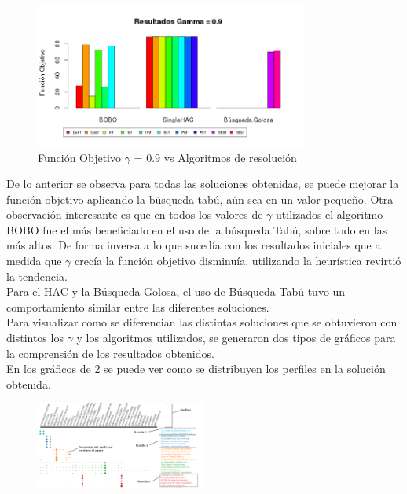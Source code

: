 \begin{figure}[H]
  \centering
    \includegraphics[width=0.8\textwidth]{resultados/papers/Graficos_agrupados/gamma09.png}
  \caption{Función Objetivo $\gamma$ = $0.9$ vs Algoritmos de resolución}
  \label{res:img-papers-agr-gamma09}
\end{figure}

De lo anterior se observa para todas las soluciones obtenidas, se puede mejorar la función objetivo aplicando la búsqueda tabú, aún sea en un valor pequeño. Otra observación interesante es que en todos los valores de $\gamma$ utilizados el algoritmo BOBO fue el más beneficiado en el uso de la búsqueda Tabú, sobre todo en las más altos. De forma inversa a lo que sucedía con los resultados iniciales que a medida que $\gamma$ crecía la función objetivo disminuía, utilizando la heurística revirtió la tendencia.\\
Para el HAC y la Búsqueda Golosa, el uso de Búsqueda Tabú tuvo un comportamiento similar entre las diferentes soluciones.\\
Para visualizar como se diferencian las distintas soluciones que se obtuvieron con distintos los $\gamma$ y los algoritmos utilizados, se generaron dos tipos de gráficos para la comprensión de los resultados obtenidos.\\
En los gráficos de \ref{res:img-explain-bars} se puede ver como se distribuyen los perfiles en la solución obtenida.
\begin{figure}[H]
  \centering
    \includegraphics[width=0.5\textwidth]{img/explain-bars.png}
  \caption{}
  \label{res:img-explain-bars}
\end{figure}

